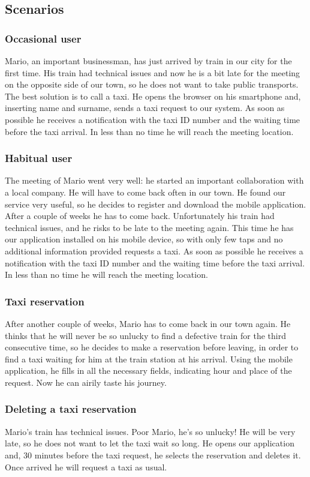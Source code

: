 \subsection{Scenarios}
\subsubsection{Occasional user}
Mario, an important businessman, has just arrived by train in our city for the first time.
His train had technical issues and now he is a bit late for the meeting on 
the opposite side of our town, so he does not want to take public transports.
The best solution is to call a taxi.
He opens the browser on his smartphone and, inserting name and surname, sends a taxi request
to our system. As soon as possible he receives a notification with the taxi ID number and the
waiting time before the taxi arrival. In less than no time he will reach the meeting location.
\subsubsection{Habitual user}
The meeting of Mario went very well: he started an important collaboration with a local
company. He will have to come back often in our town. He found our service very useful, so
he decides to register and download the mobile application. After a couple of weeks he has to
come back. Unfortunately his train had technical issues, and he risks to be late to the
meeting again. This time he has our application installed on his mobile device, so with only
few taps and no additional information provided requests a taxi. As soon as possible he receives
a notification with the taxi ID number and the	waiting time before the taxi arrival.
In less than no time he will reach the meeting location.
\subsubsection{Taxi reservation}
After another couple of weeks, Mario has to come back in our town again. He thinks that he 
will never be so unlucky to find a defective train for the third consecutive time,
so he decides to make a reservation before leaving,	in order to find a taxi waiting for him
at the train station at his arrival. Using the mobile application, he fills in all the
necessary fields, indicating hour and place of the request.
Now he can airily taste	his journey.
\subsubsection{Deleting a taxi reservation}
Mario's train has technical issues. Poor Mario, he's so unlucky! He will be very late, 
so he does not want to let the taxi wait so long. He opens our application and, 30 minutes
before the taxi request, he selects the reservation and deletes it. Once arrived he will
request a taxi as usual.
